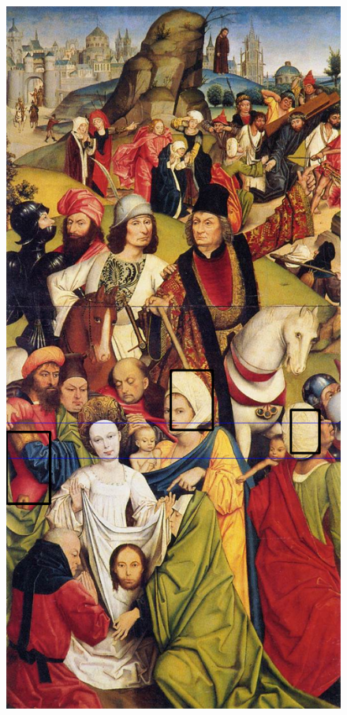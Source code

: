 \begin{figure}[h!!]
	\begin{center}
		\includegraphics[scale=0.3,angle=0]{afsnit/afprovning/billeder/naive_losning/naiv_kfarver_kdetaljer.png}
	\end{center}
	\caption[]{}
	\label{naiv_kfarver_kdetaljer}
\end{figure}

